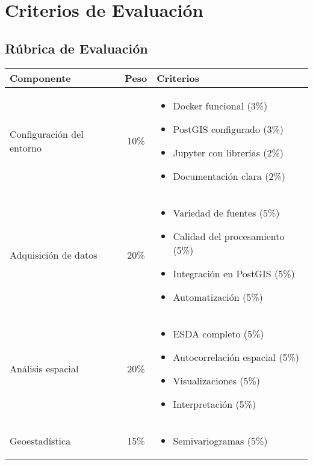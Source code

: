 \documentclass[12pt,a4paper]{article}
\begin{document}
\section{Criterios de Evaluación}

\subsection{Rúbrica de Evaluación}

\begin{table}[H]
\centering
\begin{tabular}{lcp{7cm}}
\toprule
\textbf{Componente} & \textbf{Peso} & \textbf{Criterios} \\
\midrule
Configuración del entorno & 10\% &
\begin{itemize}[leftmargin=*,topsep=0pt,itemsep=0pt]
    \item Docker funcional (3\%)
    \item PostGIS configurado (3\%)
    \item Jupyter con librerías (2\%)
    \item Documentación clara (2\%)
\end{itemize} \\
\midrule
Adquisición de datos & 20\% &
\begin{itemize}[leftmargin=*,topsep=0pt,itemsep=0pt]
    \item Variedad de fuentes (5\%)
    \item Calidad del procesamiento (5\%)
    \item Integración en PostGIS (5\%)
    \item Automatización (5\%)
\end{itemize} \\
\midrule
Análisis espacial & 20\% &
\begin{itemize}[leftmargin=*,topsep=0pt,itemsep=0pt]
    \item ESDA completo (5\%)
    \item Autocorrelación espacial (5\%)
    \item Visualizaciones (5\%)
    \item Interpretación (5\%)
\end{itemize} \\
\midrule
Geoestadística & 15\% &
\begin{itemize}[leftmargin=*,topsep=0pt,itemsep=0pt]
    \item Semivariogramas (5\%)

\end{itemize}
\end{tabular}
\end{table}
\end{document}
